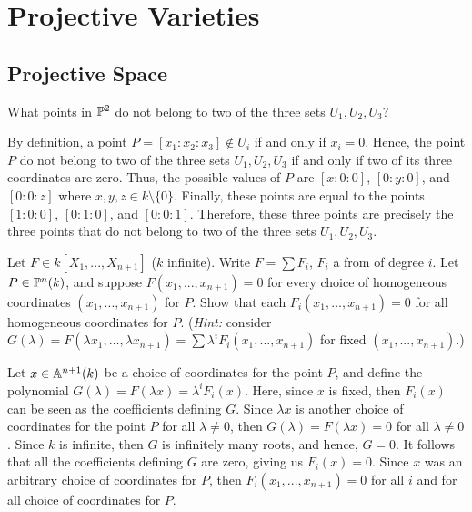\chapter{Projective Varieties}

\section{Projective Space}

\begin{exercise}
    What points in $\P^2$ do not belong to two of the three sets $U_1, U_2, U_3$? \\
\end{exercise}

\begin{solution}
    By definition, a point $P = [x_1:x_2:x_3] \notin U_i$ if and only if $x_i = 0$. Hence, the point $P$ do not belong to two of the three sets $U_1, U_2, U_3$ if and only if two of its three coordinates are zero. Thus, the possible values of $P$ are $[x : 0 : 0]$, $[0 : y : 0]$, and $[0 : 0 : z]$ where $x,y,z \in k\setminus\{0\}$. Finally, these points are equal to the points $[1 : 0 : 0]$, $[0 : 1 : 0]$, and $[0 : 0 : 1]$. Therefore, these three points are precisely the three points that do not belong to two of the three sets $U_1, U_2, U_3$. \\
\end{solution}

\begin{exercise}
    Let $F \in k[X_1, ..., X_{n+1}]$ ($k$ infinite). Write $F = \sum F_i$, $F_i$ a from of degree $i$. Let $P \in \P^n(k)$, and suppose $F(x_1, ..., x_{n+1}) = 0$ for every choice of homogeneous coordinates $(x_1, ..., x_{n+1})$ for $P$. Show that each $F_i(x_1, ..., x_{n+1}) = 0$ for all homogeneous coordinates for $P$. (\textit{Hint:} consider $G(\lambda) = F(\lambda x_1, \dots, \lambda x_{n+1}) = \sum \lambda^i F_i(x_1, ..., x_{n+1})$ for fixed $(x_1, ..., x_{n+1})$.) \\
\end{exercise}

\begin{solution}
    Let $x \in \A^{n+1}(k)$ be a choice of coordinates for the point $P$, and define the polynomial $G(\lambda) = F(\lambda x) = \lambda^i F_i(x)$. Here, since $x$ is fixed, then $F_i(x)$ can be seen as the coefficients defining $G$. Since $\lambda x$ is another choice of coordinates for the point $P$ for all $\lambda \neq 0$, then $G(\lambda) = F(\lambda x) = 0$ for all $\lambda \neq 0$. Since $k$ is infinite, then $G$ is infinitely many roots, and hence, $G = 0$. It follows that all the coefficients defining $G$ are zero, giving us $F_i(x) = 0$. Since $x$ was an arbitrary choice of coordinates for $P$, then $F_i(x_1, ..., x_{n+1}) = 0$ for all $i$ and for all choice of coordinates for $P$. \\
\end{solution}

